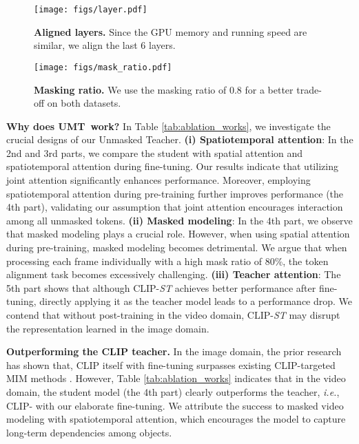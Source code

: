 \documentclass[10pt,twocolumn,letterpaper]{article}
\def\Modelnamelight{UMT}
\begin{document}
\begin{figure}[tp]
    \centering
\texttt{[image: figs/layer.pdf]}
    \vspace{-0.4cm}
    \caption{
    \textbf{Aligned layers.} 
    Since the GPU memory and running speed are similar,
    we align the last 6 layers.
    }
    \label{fig:ablation_layer}
    \vspace{-0.3cm}
\end{figure}
\begin{figure}[tp]
    \centering
\texttt{[image: figs/mask\_ratio.pdf]}
    \vspace{-0.4cm}
    \caption{
    \textbf{Masking ratio.} 
    We use the masking ratio of 0.8 for a better trade-off on both datasets.
    }
    \label{fig:ablation_ratio}
    \vspace{-0.4cm}
\end{figure}


\textbf{Why does \Modelnamelight\  work?}
In Table \ref{tab:ablation_works}, 
we investigate the crucial designs of our Unmasked Teacher. 
\textbf{(i) Spatiotemporal attention}: 
In the 2nd and 3rd parts, 
we compare the student with spatial attention and spatiotemporal attention during fine-tuning. 
Our results indicate that utilizing joint attention significantly enhances performance. 
Moreover, 
employing spatiotemporal attention during pre-training further improves performance (the 4th part), 
validating our assumption that joint attention encourages interaction among all unmasked tokens.
\textbf{(ii) Masked modeling}:
In the 4th part,
we observe that masked modeling plays a crucial role. 
However, 
when using spatial attention during pre-training, 
masked modeling becomes detrimental. 
We argue that when processing each frame individually with a high mask ratio of 80\%,
the token alignment task becomes excessively challenging.
\textbf{(iii) Teacher attention}:
The 5th part shows that although CLIP-\textit{ST} achieves better performance after fine-tuning, 
directly applying it as the teacher model leads to a performance drop. 
We contend that without post-training in the video domain, 
CLIP-\textit{ST} may disrupt the representation learned in the image domain.

\textbf{Outperforming the CLIP teacher.}
In the image domain,
the prior research \cite{Dong2022CLIPII} has shown that,
CLIP itself with fine-tuning surpasses existing CLIP-targeted MIM methods \cite{mvp,fd_clip,milan,maskdistill}.
However,
Table \ref{tab:ablation_works} indicates that in the video domain,
the student model (the 4th part) clearly outperforms the teacher,
\textit{i.e.},
CLIP- with our elaborate fine-tuning.
We attribute the success to masked video modeling with spatiotemporal attention,
which encourages the model to capture long-term dependencies among objects.
\end{document}
